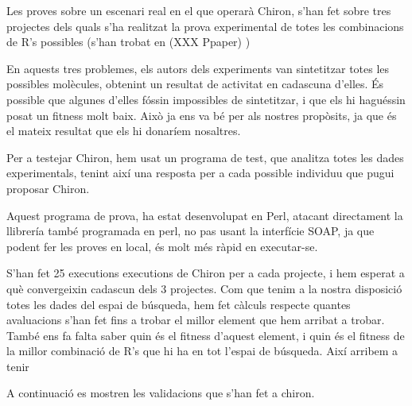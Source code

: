 	Les proves sobre un escenari real en el que operarà Chiron, s'han fet sobre
	tres projectes dels quals s'ha realitzat la prova experimental de totes les
	combinacions de R's possibles (s'han trobat en (XXX Ppaper) )

	En aquests tres problemes, els autors dels experiments van sintetitzar totes
	les possibles molècules, obtenint un resultat de activitat en cadascuna
	d'elles.  És possible que algunes d'elles fóssin impossibles de sintetitzar,
	i que els hi haguéssin posat un fitness molt baix.  Això ja ens va bé per
	als nostres propòsits, ja que és el mateix resultat que els hi donaríem
	nosaltres.

	Per a testejar Chiron, hem usat un programa de test, que analitza totes les
	dades experimentals, tenint així una resposta per a cada possible individuu
	que pugui proposar Chiron.

	Aquest programa de prova, ha estat desenvolupat en Perl, atacant directament
	la llibrería també programada en perl, no pas usant la interfície SOAP, ja
	que podent fer les proves en local, és molt més ràpid en executar-se.

	S'han fet 25 executions executions de Chiron per a cada projecte, i hem
	esperat a què convergeixin cadascun dels 3 projectes.  Com que tenim a la
	nostra disposició totes les dades del espai de búsqueda, hem fet càlculs
	respecte quantes avaluacions s'han fet fins a trobar el millor element que
	hem arribat a trobar.  També ens fa falta saber quin és el fitness d'aquest
	element, i quin és el fitness de la millor combinació de R's que hi ha en
	tot l'espai de búsqueda. Així arribem a tenir




	A continuació es mostren les validacions que s'han fet a chiron.  


